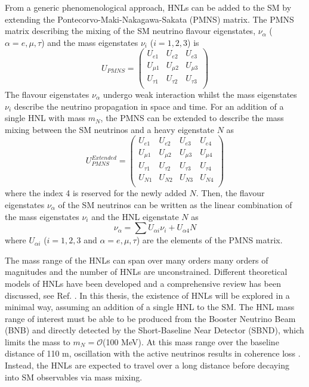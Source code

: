 From a generic phenomenological approach, HNLs can be added to the SM by extending the Pontecorvo-Maki-Nakagawa-Sakata (PMNS) matrix.
The PMNS matrix describing the mixing of the SM neutrino flavour eigenstates, $\nu_{\alpha}$ ($\alpha=e,\mu,\tau$) and the mass eigenstates $\nu_{i}$ ($i=1,2,3$) is
\begin{equation}
	U_{PMNS} =
	\begin{pmatrix}
		U_{e1} & U_{e2} & U_{e3}\\
		U_{\mu1} & U_{\mu2} & U_{\mu3}\\
		U_{\tau1} & U_{\tau2} & U_{\tau3}\\
	\end{pmatrix}
\end{equation}
The flavour eigenstates $\nu_{\alpha}$ undergo weak interaction whilst the mass eigenstates $\nu_{i}$ describe the neutrino propagation in space and time.
For an addition of a single HNL with mass $m_{N}$, the PMNS can be extended to describe the mass mixing between the SM neutrinos and a heavy eigenstate $N$ as 
\begin{equation}
	U_{PMNS}^{Extended} =
	\begin{pmatrix}
		U_{e1} & U_{e2} & U_{e3} & U_{e4}\\
		U_{\mu1} & U_{\mu2} & U_{\mu3} & U_{\mu4}\\
		U_{\tau1} & U_{\tau2} & U_{\tau3} & U_{\tau4}\\
		U_{N1} & U_{N2} & U_{N3} & U_{N4}\\
	\end{pmatrix}
\end{equation}
where the index 4 is reserved for the newly added $N$.
Then, the flavour eigenstates  $\nu_{\alpha}$ of the SM neutrinos can be written as the linear combination of the mass eigenstates $\nu_{i}$ and the HNL eigenstate $N$ as  
\begin{equation}
	\nu_{\alpha}=\sum U_{\alpha i}\nu_{i} + U_{\alpha 4}N
\end{equation}
where $U_{\alpha i }$ ($i=1,2,3$ and $\alpha=e,\mu,\tau$) are the elements of the PMNS matrix.

The mass range of the HNLs can span over many orders many orders of magnitudes and the number of HNLs are unconstrained.
Different theoretical models of HNLs have been developed and a comprehensive review has been discussed, see Ref. \cite{}. 
In this thesis, the existence of HNLs will be explored in a minimal way, assuming an addition of a single HNL to the SM.  
The HNL mass range of interest must be able to be produced from the Booster Neutrino Beam (BNB) and directly detected by the Short-Baseline Near Detector (SBND), which limits the mass to $m_{N}=\mathcal{O}$(100 MeV).
At this mass range over the baseline distance of 110 m, oscillation with the active neutrinos results in coherence loss \cite{}.
Instead, the HNLs are expected to travel over a long distance before decaying into SM observables via mass mixing.

